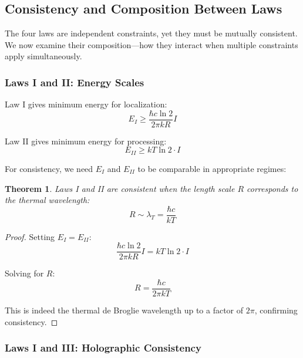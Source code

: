 \documentclass[11pt,a4paper]{article}
\theoremstyle{plain}
\newtheorem{theorem}{Theorem}[section]
\theoremstyle{definition}
\theoremstyle{remark}
\begin{document}
\subsection{Consistency and Composition Between Laws}

The four laws are independent constraints, yet they must be mutually consistent. We now examine their composition—how they interact when multiple constraints apply simultaneously.

\subsubsection{Laws I and II: Energy Scales}

Law I gives minimum energy for localization:
\begin{equation}
E_I \geq \frac{\hbar c\ln 2}{2\pi kR}I
\end{equation}

Law II gives minimum energy for processing:
\begin{equation}
E_{II} \geq kT\ln 2\cdot I
\end{equation}

For consistency, we need $E_I$ and $E_{II}$ to be comparable in appropriate regimes:

\begin{theorem}
Laws I and II are consistent when the length scale $R$ corresponds to the thermal wavelength:
\begin{equation}
R \sim \lambda_T = \frac{\hbar c}{kT}
\end{equation}
\end{theorem}

\begin{proof}
Setting $E_I = E_{II}$:
\begin{equation}
\frac{\hbar c\ln 2}{2\pi kR}I = kT\ln 2\cdot I
\end{equation}

Solving for $R$:
\begin{equation}
R = \frac{\hbar c}{2\pi kT}
\end{equation}

This is indeed the thermal de Broglie wavelength up to a factor of $2\pi$, confirming consistency.
\end{proof}

\subsubsection{Laws I and III: Holographic Consistency}
\end{document}
